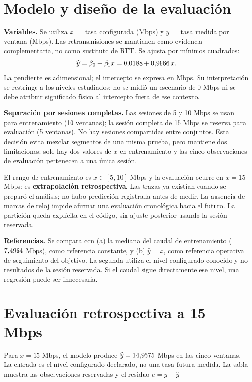 \documentclass[11pt,letterpaper]{article}
\begin{document}
\section{Modelo y diseño de la evaluación}
\textbf{Variables.} Se utiliza $x=$ tasa configurada (Mbps) y $y=$ tasa medida por ventana (Mbps). Las retransmisiones se mantienen como evidencia complementaria, no como sustituto de RTT. Se ajusta por mínimos cuadrados:
\[
\widehat y=\beta_0+\beta_1x = 0{,}0188 + 0{,}9966\,x.
\]
La pendiente es adimensional; el intercepto se expresa en Mbps. Su interpretación se restringe a los niveles estudiados: no se midió un escenario de 0 Mbps ni se debe atribuir significado físico al intercepto fuera de ese contexto.

\textbf{Separación por sesiones completas.} Las sesiones de 5 y 10 Mbps se usan para entrenamiento (10 ventanas); la sesión completa de 15 Mbps se reserva para evaluación (5 ventanas). No hay sesiones compartidas entre conjuntos. Esta decisión evita mezclar segmentos de una misma prueba, pero mantiene dos limitaciones: solo hay dos valores de $x$ en entrenamiento y las cinco observaciones de evaluación pertenecen a una única sesión.

El rango de entrenamiento es $x\in[5,10]$ Mbps y la evaluación ocurre en $x=15$ Mbps: es \textbf{extrapolación retrospectiva}. Las trazas ya existían cuando se preparó el análisis; no hubo predicción registrada antes de medir. La ausencia de marcas de reloj impide afirmar una evaluación cronológica hacia el futuro. La partición queda explícita en el código, sin ajuste posterior usando la sesión reservada.

\textbf{Referencias.} Se compara con (a) la mediana del caudal de entrenamiento ($7{,}4964$ Mbps), como referencia constante, y (b) $\widehat y=x$, como referencia operativa de seguimiento del objetivo. La segunda utiliza el nivel configurado conocido y no resultados de la sesión reservada. Si el caudal sigue directamente ese nivel, una regresión puede ser innecesaria.

\newpage
\section{Evaluación retrospectiva a 15 Mbps}
Para $x=15$ Mbps, el modelo produce $\widehat y=14{,}9675$ Mbps en las cinco ventanas. La entrada es el nivel configurado declarado, no una tasa futura medida. La tabla muestra las observaciones reservadas y el residuo $e=y-\widehat y$.
\end{document}
